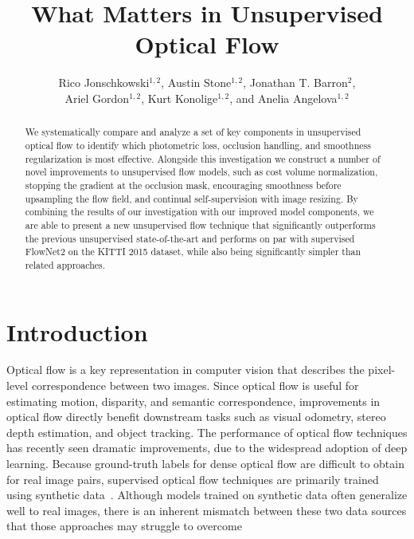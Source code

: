 \documentclass[runningheads]{llncs}
\begin{document}
\pagestyle{headings}
\mainmatter
\def\ECCVSubNumber{3651}  

\title{What Matters in Unsupervised Optical Flow}



\author{Rico Jonschkowski$^{1,2}$, Austin Stone$^{1,2}$, Jonathan T. Barron$^{2}$,\\Ariel Gordon$^{1,2}$, Kurt Konolige$^{1,2}$, and Anelia Angelova$^{1,2}$}

\maketitle


\begin{abstract}
We systematically compare and analyze a set of key components in unsupervised optical flow to identify which photometric loss, occlusion handling, and smoothness regularization is most effective. Alongside this investigation we construct a number of novel improvements to unsupervised flow models, such as cost volume normalization, stopping the gradient at the occlusion mask, encouraging smoothness before upsampling the flow field, and continual self-supervision with image resizing. By combining the results of our investigation with our improved model components, we are able to present a new unsupervised flow technique that significantly outperforms the previous unsupervised state-of-the-art and performs on par with supervised FlowNet2 on the KITTI 2015 dataset, while also being significantly simpler than related approaches.
\end{abstract}

\section{Introduction}

Optical flow is a key representation in computer vision that describes the pixel-level correspondence between two images. Since optical flow is useful for estimating motion, disparity, and semantic correspondence, improvements in optical flow directly benefit downstream tasks such as visual odometry, stereo depth estimation, and object tracking.
The performance of optical flow techniques has recently seen dramatic improvements, due to the widespread adoption of deep learning.
Because ground-truth labels for dense optical flow are difficult to obtain for real image pairs, supervised optical flow techniques are primarily trained using synthetic data~\cite{FlowNet}.
Although models trained on synthetic data often generalize well to real images, there is an inherent mismatch between these two data sources that those approaches may struggle to overcome~\cite{Mayer2018,datasetbias}
\end{document}
